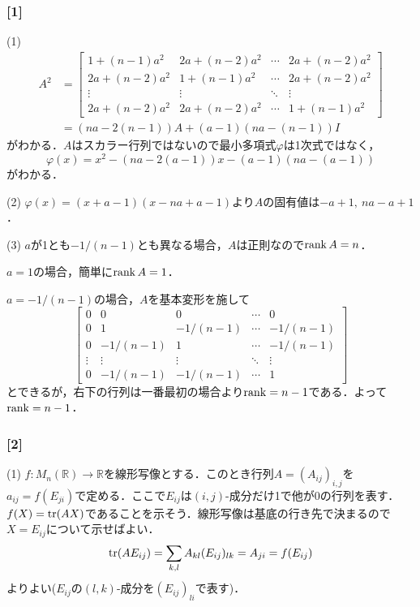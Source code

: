 \documentclass[a4j]{ltjsarticle}
\newcommand{\Rset}{\mathbb{R}}
\newcommand{\1}{\mathbbm{1}}
\numberwithin{equation}{section}
\theoremstyle{definition}
\begin{document}
\subsubsection*{[1]}
(1) 
\begin{align}
    A^2&=\begin{bmatrix}
        1+(n-1)a^2 & 2a+(n-2)a^2 & \cdots & 2a+(n-2)a^2 \\ 
        2a+(n-2)a^2 & 1+(n-1)a^2 & \cdots & 2a+(n-2)a^2 \\
        \vdots & \vdots & \ddots & \vdots \\
        2a+(n-2)a^2 & 2a+(n-2)a^2 & \cdots & 1+(n-1)a^2
    \end{bmatrix}\\
    &=(na-2(n-1))A+(a-1)(na-(n-1))I
\end{align}
がわかる．$A$はスカラー行列ではないので最小多項式$\varphi$は1次式ではなく，
\begin{equation}
    \varphi(x)=x^2-(na-2(a-1))x-(a-1)(na-(a-1))
\end{equation}
がわかる．

(2) $\varphi(x)=(x+a-1)(x-na+a-1)$より$A$の固有値は$-a+1,\ na-a+1$．

(3) $a$が1とも$-1/(n-1)$とも異なる場合，$A$は正則なので$\rank A=n$．

$a=1$の場合，簡単に$\rank A=1$．

$a=-1/(n-1)$の場合，$A$を基本変形を施して
\begin{equation}
    \begin{bmatrix}
        0 & 0 & 0 & \cdots & 0 \\
        0 & 1 & -1/(n-1) & \cdots & -1/(n-1) \\
        0 & -1/(n-1) & 1 & \cdots & -1/(n-1) \\
        \vdots & \vdots & \vdots & \ddots & \vdots \\
        0 & -1/(n-1) & -1/(n-1) & \cdots & 1
    \end{bmatrix}
\end{equation}
とできるが，右下の行列は一番最初の場合より$\rank=n-1$である．よって$\rank=n-1$．

\subsubsection*{[2]}
(1) $f\colon M_n(\Rset)\to\Rset$を線形写像とする．このとき行列$A=(A_{ij})_{i,j}$を$a_{ij}=f(E_{ji})$で定める．ここで$E_{ij}$は$(i,j)$-成分だけ1で他が0の行列を表す．$f(X)=\tr(AX)$であることを示そう．線形写像は基底の行き先で決まるので$X=E_{ij}$について示せばよい．
\begin{equation}
    \tr(AE_{ij})=\sum_{k,l}A_{kl}(E_{ij})_{lk}=A_{ji}=f(E_{ij})
\end{equation}
よりよい($E_{ij}$の$(l,k)$-成分を$(E_{ij})_{li}$で表す)．
\end{document}
